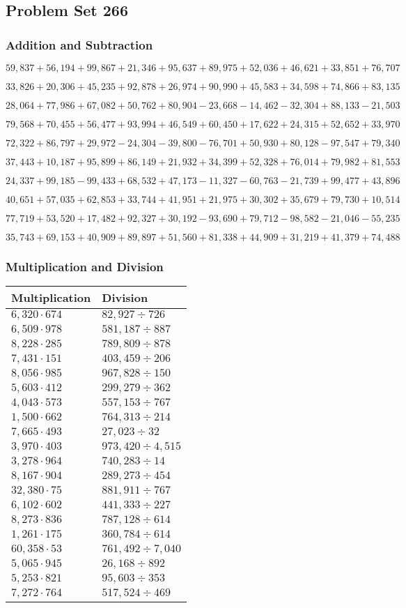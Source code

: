 \hypertarget{problem-set-266}{%
\subsection{Problem Set 266}\label{problem-set-266}}

\hypertarget{addition-and-subtraction}{%
\subsubsection{Addition and
Subtraction}\label{addition-and-subtraction}}

\(59,837+56,194+99,867+21,346+95,637+89,975+52,036+46,621+33,851+76,707\)

\(33,826+20,306+45,235+92,878+26,974+90,990+45,583+34,598+74,866+83,135\)

\(28,064+77,986+67,082+50,762+80,904-23,668-14,462-32,304+88,133-21,503\)

\(79,568+70,455+56,477+93,994+46,549+60,450+17,622+24,315+52,652+33,970\)

\(72,322+86,797+29,972-24,304-39,800-76,701+50,930+80,128-97,547+79,340\)

\(37,443+10,187+95,899+86,149+21,932+34,399+52,328+76,014+79,982+81,553\)

\(24,337+99,185-99,433+68,532+47,173-11,327-60,763-21,739+99,477+43,896\)

\(40,651+57,035+62,853+33,744+41,951+21,975+30,302+35,679+79,730+10,514\)

\(77,719+53,520+17,482+92,327+30,192-93,690+79,712-98,582-21,046-55,235\)

\(35,743+69,153+40,909+89,897+51,560+81,338+44,909+31,219+41,379+74,488\)

\hypertarget{multiplication-and-division}{%
\subsubsection{Multiplication and
Division}\label{multiplication-and-division}}

\begin{longtable}[]{@{}ll@{}}
\toprule
Multiplication & Division\tabularnewline
\midrule
\endhead
\(6,320\cdot674\) & \(82,927÷726\)\tabularnewline
\(6,509\cdot978\) & \(581,187÷887\)\tabularnewline
\(8,228\cdot285\) & \(789,809÷878\)\tabularnewline
\(7,431\cdot151\) & \(403,459÷206\)\tabularnewline
\(8,056\cdot985\) & \(967,828÷150\)\tabularnewline
\(5,603\cdot412\) & \(299,279÷362\)\tabularnewline
\(4,043\cdot573\) & \(557,153÷767\)\tabularnewline
\(1,500\cdot662\) & \(764,313÷214\)\tabularnewline
\(7,665\cdot493\) & \(27,023÷32\)\tabularnewline
\(3,970\cdot403\) & \(973,420÷4,515\)\tabularnewline
\(3,278\cdot964\) & \(740,283÷14\)\tabularnewline
\(8,167\cdot904\) & \(289,273÷454\)\tabularnewline
\(32,380\cdot75\) & \(881,911÷767\)\tabularnewline
\(6,102\cdot602\) & \(441,333÷227\)\tabularnewline
\(8,273\cdot836\) & \(787,128÷614\)\tabularnewline
\(1,261\cdot175\) & \(360,784÷614\)\tabularnewline
\(60,358\cdot53\) & \(761,492÷7,040\)\tabularnewline
\(5,065\cdot945\) & \(26,168÷892\)\tabularnewline
\(5,253\cdot821\) & \(95,603÷353\)\tabularnewline
\(7,272\cdot764\) & \(517,524÷469\)\tabularnewline
\bottomrule
\end{longtable}
